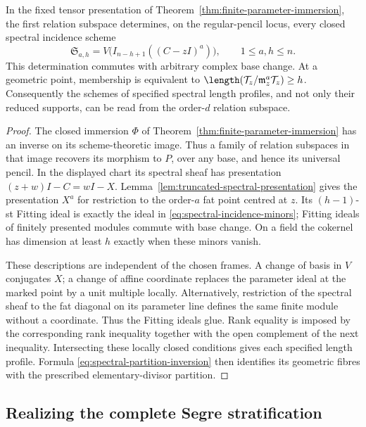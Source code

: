 \begin{theorem}
\label{thm:relative-spectral-readout}
In the fixed tensor presentation of
Theorem~\ref{thm:finite-parameter-immersion}, the first relation
subspace determines, on the regular-pencil locus, every closed
spectral incidence scheme
\begin{equation}\label{eq:spectral-incidence-minors}
 \mathfrak S_{a,h}
       =V\bigl(I_{n-h+1}((C-zI)^a)\bigr),
       \qquad 1\le a,h\le n.
\end{equation}
This determination commutes with arbitrary complex base change.
At a geometric point, membership is equivalent to
\(\length(\mathcal T_z/\mathfrak m_z^a\mathcal T_z)\ge h\).
Consequently the schemes of specified spectral length profiles, and
not only their reduced supports, can be read from the order-\(d\)
relation subspace.
\end{theorem}
\begin{proof}
The closed immersion \(\Phi\) of
Theorem~\ref{thm:finite-parameter-immersion} has an inverse on its
scheme-theoretic image.  Thus a family of relation subspaces in that
image recovers its morphism to \(P\), over any base, and hence its
universal pencil.  In the displayed chart its spectral sheaf has
presentation \((z+w)I-C=wI-X\).  Lemma~\ref{lem:truncated-spectral-presentation}
gives the presentation \(X^a\) for restriction to the order-\(a\)
fat point centred at \(z\).  Its \((h-1)\)-st Fitting ideal is
exactly the ideal in \eqref{eq:spectral-incidence-minors}; Fitting
ideals of finitely presented modules commute with base change.
On a field the cokernel has dimension at least \(h\) exactly when
these minors vanish.

These descriptions are independent of the chosen frames.  A change
of basis in \(V\) conjugates \(X\); a change of affine coordinate
replaces the parameter ideal at the marked point by a unit multiple
locally.  Alternatively, restriction of the spectral sheaf to the
fat diagonal on its parameter line defines the same finite module
without a coordinate.  Thus the Fitting ideals glue.  Rank equality
is imposed by the corresponding rank inequality together with the
open complement of the next inequality.  Intersecting these locally
closed conditions gives each specified length profile.  Formula
\eqref{eq:spectral-partition-inversion} then identifies its geometric
fibres with the prescribed elementary-divisor partition.
\end{proof}

\subsection{Realizing the complete Segre stratification}

